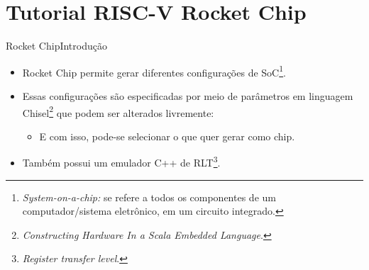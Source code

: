 \documentclass[aspectratio=169, xcolor=dvipsnames]{beamer}
\let\olditem=\item%
\renewcommand{\item}{\olditem \justifying}
\begin{document}

\section{Tutorial RISC-V Rocket Chip}
\begin{frame}{Rocket Chip}{Introdução}
	\begin{itemize}
		\setlength{\itemsep}{1.5em}
		\item Rocket Chip permite gerar diferentes configurações de SoC\footnote{\textit{System-on-a-chip:} se refere a todos os componentes de um computador/sistema eletrônico, em um circuito integrado.}.
	
		\item Essas configurações são especificadas por meio de parâmetros em linguagem Chisel\footnote{\textit{Constructing Hardware In a Scala Embedded Language}.} que podem ser alterados livremente:
		\begin{itemize}
			\item E com isso, pode-se selecionar o que quer gerar como chip.
		\end{itemize}
		\item Também possui um emulador C++ de RLT\footnote{\textit{Register transfer level}.}.
	\end{itemize}
\end{frame}
\end{document}
